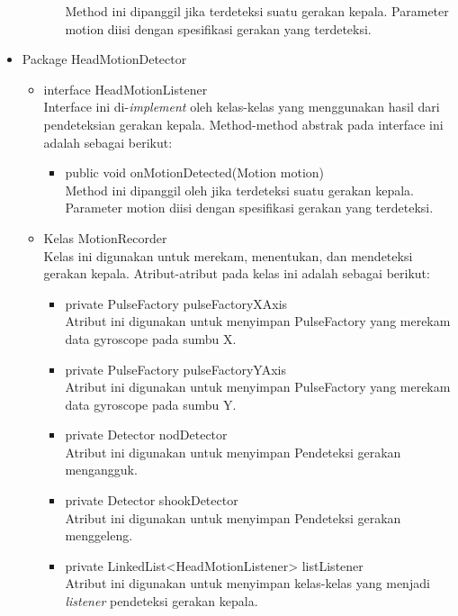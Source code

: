 \begin{itemize}
\begin{itemize}
\begin{itemize}
            Method ini dipanggil jika terdeteksi suatu gerakan kepala. Parameter motion diisi dengan spesifikasi gerakan yang terdeteksi.
        \end{itemize}
    \end{itemize}
    \item Package HeadMotionDetector
    \begin{itemize}
        \item interface HeadMotionListener\\
        Interface ini di-\textit{implement} oleh kelas-kelas yang menggunakan hasil dari pendeteksian gerakan kepala.
        Method-method abstrak pada interface ini adalah sebagai berikut:
        \begin{itemize}
            \item public void onMotionDetected(Motion motion)\\
            Method ini dipanggil oleh jika terdeteksi suatu gerakan kepala. Parameter motion diisi dengan spesifikasi gerakan yang terdeteksi.
        \end{itemize}
        \item Kelas MotionRecorder\\
        Kelas ini digunakan untuk merekam, menentukan, dan mendeteksi gerakan kepala. 
        Atribut-atribut pada kelas ini adalah sebagai berikut:
        \begin{itemize}
            \item private PulseFactory pulseFactoryXAxis\\
            Atribut ini digunakan untuk menyimpan PulseFactory yang merekam data gyroscope pada sumbu X.
            \item private PulseFactory pulseFactoryYAxis\\
            Atribut ini digunakan untuk menyimpan PulseFactory yang merekam data gyroscope pada sumbu Y.
            \item private Detector nodDetector\\
            Atribut ini digunakan untuk menyimpan Pendeteksi gerakan mengangguk.
            \item private Detector shookDetector\\
            Atribut ini digunakan untuk menyimpan Pendeteksi gerakan menggeleng.
            \item private LinkedList<HeadMotionListener> listListener\\
            Atribut ini digunakan untuk menyimpan kelas-kelas yang menjadi \textit{listener} pendeteksi gerakan kepala.

\end{itemize}
\end{itemize}
\end{itemize}

